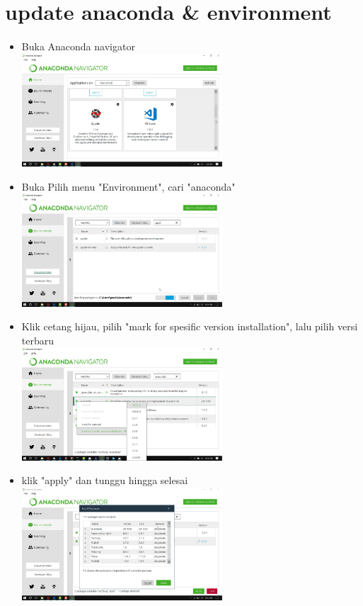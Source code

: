 \documentclass[a4paper,12pt]{report}
\begin{document}
\section{update anaconda \& environment}
\paragraph{} 
\begin{itemize}
	\item Buka Anaconda navigator\\
	\includegraphics[width=7.5cm]{gambar/update anaconda/Screenshot (72).png} 
	\item Buka Pilih menu "Environment", cari "anaconda"\\
	\includegraphics[width=7.5cm]{gambar/update anaconda/Screenshot (74).png} 
	\item Klik cetang hijau, pilih "mark for spesific version installation", lalu pilih versi terbaru\\
	\includegraphics[width=7.5cm]{gambar/update anaconda/Screenshot (97).png} 
	\item klik "apply" dan tunggu hingga selesai\\
	\includegraphics[width=7.5cm]{gambar/update anaconda/Screenshot (73).png} 
\end{itemize}
\end{document}
